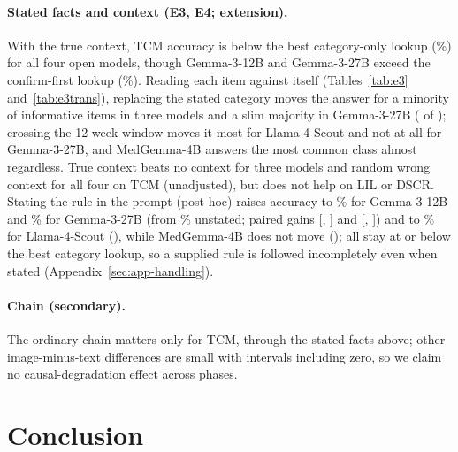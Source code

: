 \documentclass[11pt]{article}
\begin{document}
\paragraph{Stated facts and context (E3, E4; extension).} With the true context, TCM accuracy is below the best category-only lookup (\vfourTcmLookupEsc{}\%) for all four open models, though Gemma-3-12B and Gemma-3-27B exceed the confirm-first lookup (\vfourTcmLookupConf{}\%). Reading each item against itself (Tables~\ref{tab:e3} and~\ref{tab:e3trans}), replacing the stated category moves the answer for a minority of informative items in three models and a slim majority in Gemma-3-27B (\vfourTransLabelMovedGemmaTwentySeven{} of \vfourTransLabelInfGemmaTwentySeven{}); crossing the 12-week window moves it most for Llama-4-Scout and not at all for Gemma-3-27B, and MedGemma-4B answers the most common class almost regardless. True context beats no context for three models and random wrong context for all four on TCM (unadjusted), but does not help on LIL or DSCR. Stating the rule in the prompt (post hoc) raises accuracy to \vfourExplAccGemmaTwelve{}\% for Gemma-3-12B and \vfourExplAccGemmaTwentySeven{}\% for Gemma-3-27B (from \vfourExplGoldGemmaTwelve{}\% unstated; paired gains \vfourExplDiffGemmaTwelve{} [\vfourExplLoGemmaTwelve{}, \vfourExplHiGemmaTwelve{}] and \vfourExplDiffGemmaTwentySeven{} [\vfourExplLoGemmaTwentySeven{}, \vfourExplHiGemmaTwentySeven{}]) and to \vfourExplAccScout{}\% for Llama-4-Scout (\vfourExplDiffScout{}), while MedGemma-4B does not move (\vfourExplDiffMedGemma{}); all stay at or below the best category lookup, so a supplied rule is followed incompletely even when stated (Appendix~\ref{sec:app-handling}).

\paragraph{Chain (secondary).} The ordinary chain matters only for TCM, through the stated facts above; other image-minus-text differences are small with intervals including zero, so we claim no causal-degradation effect across phases.











\section{Conclusion}
\label{sec:conclusion}
\end{document}

